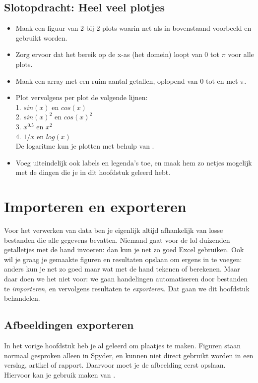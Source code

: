 \documentclass[a4paper,11pt, fleqn]{article}
\newcommand{\ditwc}{Naam van het huidige werkcollege}
\begin{document}
\subsection{Slotopdracht: Heel veel plotjes}
\begin{itemize}
	\item Maak een figuur van 2-bij-2 plots waarin net als in bovenstaand voorbeeld  en  gebruikt worden.
	\item Zorg ervoor dat het bereik op de x-as (het domein) loopt van 0 tot $\pi$ voor alle plots.
	\item Maak een array  met een ruim aantal getallen, oplopend van 0 tot en met $\pi$.
	\item Plot vervolgens per plot de volgende lijnen:\\
	1. $sin(x)$ en $cos(x)$\\
	2. $sin(x)^2$ en $cos(x)^2$\\
	3. $x^{0.5}$ en $x^2$\\
	4. $1/x$ en $log(x)$\\
	De logaritme kun je plotten met behulp van .
	\item Voeg uiteindelijk ook labels en legenda's toe, en maak hem zo netjes mogelijk met de dingen die je in dit hoofdstuk geleerd hebt.
\end{itemize}


\clearpage
\renewcommand{\ditwc}{Importeren en exporteren}
\section[Importeren en exporteren]{\ditwc}
Voor het verwerken van data ben je eigenlijk altijd afhankelijk van losse bestanden die alle gegevens bevatten. Niemand gaat voor de lol duizenden getalletjes met de hand invoeren: dan kun je net zo goed Excel gebruiken. Ook wil je graag je gemaakte figuren en resultaten opslaan om ergens in te voegen: anders kun je net zo goed maar wat met de hand tekenen of berekenen. Maar daar doen we het niet voor: we gaan handelingen automatiseren door bestanden te \textit{importeren}, en vervolgens resultaten te \textit{exporteren}. Dat gaan we dit hoofdstuk behandelen.

\subsection{Afbeeldingen exporteren}
In het vorige hoofdstuk heb je al geleerd om plaatjes te maken. Figuren staan normaal gesproken alleen in Spyder, en kunnen niet direct gebruikt worden in een verslag, artikel of rapport. Daarvoor moet je de afbeelding eerst opslaan. Hiervoor kan je gebruik maken van .
\end{document}
